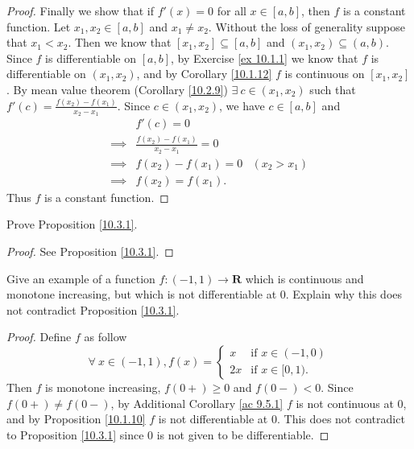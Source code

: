 \begin{proof}
    Finally we show that if \(f'(x) = 0\) for all \(x \in [a, b]\), then \(f\) is a constant function.
    Let \(x_1, x_2 \in [a, b]\) and \(x_1 \neq x_2\).
    Without the loss of generality suppose that \(x_1 < x_2\).
    Then we know that \([x_1, x_2] \subseteq [a, b]\) and \((x_1, x_2) \subseteq (a, b)\).
    Since \(f\) is differentiable on \([a, b]\), by Exercise \ref{ex 10.1.1} we know that \(f\) is differentiable on \((x_1, x_2)\), and by Corollary \ref{10.1.12} \(f\) is continuous on \([x_1, x_2]\).
    By mean value theorem (Corollary \ref{10.2.9}) \(\exists\ c \in (x_1, x_2)\) such that \(f'(c) = \frac{f(x_2) - f(x_1)}{x_2 - x_1}\).
    Since \(c \in (x_1, x_2)\), we have \(c \in [a, b]\) and
    \begin{align*}
                 & f'(c) = 0                                           \\
        \implies & \frac{f(x_2) - f(x_1)}{x_2 - x_1} = 0               \\
        \implies & f(x_2) - f(x_1) = 0                   & (x_2 > x_1) \\
        \implies & f(x_2) = f(x_1).
    \end{align*}
    Thus \(f\) is a constant function.
\end{proof}

\exercisesection

\begin{exercise}\label{ex 10.3.1}
    Prove Proposition \ref{10.3.1}.
\end{exercise}

\begin{proof}
    See Proposition \ref{10.3.1}.
\end{proof}

\begin{exercise}\label{ex 10.3.2}
    Give an example of a function \(f : (-1, 1) \to \mathbf{R}\) which is continuous and monotone increasing, but which is not differentiable at \(0\).
    Explain why this does not contradict Proposition \ref{10.3.1}.
\end{exercise}

\begin{proof}
    Define \(f\) as follow
    \[
        \forall\ x \in (-1, 1), f(x) = \begin{cases}
            x  & \text{if } x \in (-1, 0) \\
            2x & \text{if } x \in [0, 1).
        \end{cases}
    \]
    Then \(f\) is monotone increasing, \(f(0+) \geq 0\) and \(f(0-) < 0\).
    Since \(f(0+) \neq f(0-)\), by Additional Corollary \ref{ac 9.5.1} \(f\) is not continuous at \(0\), and by Proposition \ref{10.1.10} \(f\) is not differentiable at \(0\).
    This does not contradict to Proposition \ref{10.3.1} since \(0\) is not given to be differentiable.
\end{proof}


